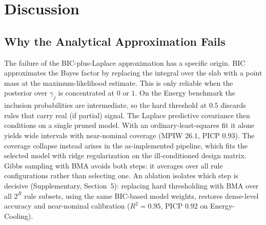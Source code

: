 \documentclass[review,1p,times]{elsarticle}
\begin{document}
\FloatBarrier

\section{Discussion}
\label{sec:discussion}

\subsection{Why the Analytical Approximation Fails}

The failure of the BIC-plus-Laplace approximation has a specific origin.
BIC approximates the Bayes factor \cite{kass1995bayes} by replacing the integral over the slab with a point mass at the maximum-likelihood estimate.
This is only reliable when the posterior over $\gamma_j$ is concentrated at $0$ or $1$. On the Energy benchmark the inclusion probabilities are intermediate, so the hard threshold at $0.5$ discards rules that carry real (if partial) signal.
The Laplace predictive covariance then conditions on a single pruned model.
With an ordinary-least-squares fit it alone yields wide intervals with near-nominal coverage (MPIW $26.1$, PICP $0.93$).
The coverage collapse instead arises in the as-implemented pipeline, which fits the selected model with ridge regularization on the ill-conditioned design matrix. Gibbs sampling with BMA avoids both steps: it averages over all rule configurations rather than selecting one.
An ablation isolates which step is decisive (Supplementary, Section~5): replacing hard thresholding with BMA over all $2^R$ rule subsets, using the same BIC-based model weights, restores dense-level accuracy and near-nominal calibration ($R^2=0.95$, PICP $0.92$ on Energy-Cooling).
\end{document}
